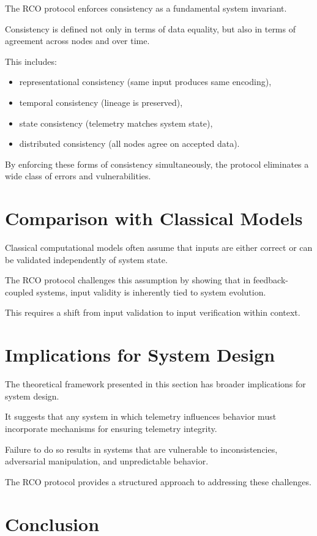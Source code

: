 The RCO protocol enforces consistency as a fundamental system invariant.

Consistency is defined not only in terms of data equality, but also in terms of agreement across nodes and over time.

This includes:
\begin{itemize}
\item representational consistency (same input produces same encoding),
\item temporal consistency (lineage is preserved),
\item state consistency (telemetry matches system state),
\item distributed consistency (all nodes agree on accepted data).
\end{itemize}

By enforcing these forms of consistency simultaneously, the protocol eliminates a wide class of errors and vulnerabilities.

\section{Comparison with Classical Models}

Classical computational models often assume that inputs are either correct or can be validated independently of system state.

The RCO protocol challenges this assumption by showing that in feedback-coupled systems, input validity is inherently tied to system evolution.

This requires a shift from input validation to input verification within context.

\section{Implications for System Design}

The theoretical framework presented in this section has broader implications for system design.

It suggests that any system in which telemetry influences behavior must incorporate mechanisms for ensuring telemetry integrity.

Failure to do so results in systems that are vulnerable to inconsistencies, adversarial manipulation, and unpredictable behavior.

The RCO protocol provides a structured approach to addressing these challenges.

\section{Conclusion}

